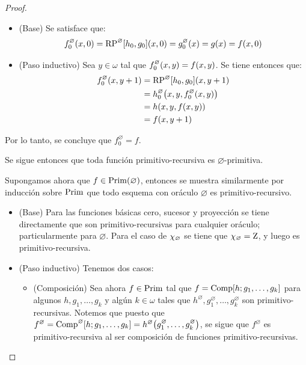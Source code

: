 \begin{proof}
\begin{enumerate}
\begin{itemize}
\begin{itemize}
				\begin{itemize}
					\item (Base) Se satisface que:
					\[
						f_{0}^{\varnothing}\pa*{x, 0} =\RECURSION^{\varnothing}\bra*{h_{0}, g_{0}}\pa*{x, 0} = g_{0}^{\varnothing}\pa*{x} = g\pa*{x} = f\pa*{x, 0}
					\]
					\item (Paso inductivo) Sea $y\in\omega$ tal que $f_{0}^{\varnothing}\pa*{x, y} = f\pa*{x, y}$. Se tiene entonces que:
					\begin{align*}
						f_{0}^{\varnothing}\pa*{x, y + 1} &=\RECURSION^{\varnothing}\bra*{h_{0}, g_{0}}\pa*{x, y + 1}\\
						&= h_{0}^{\varnothing}\pa*{x, y, f_{0}^{\varnothing}\pa*{x, y}}\\
						&= h\pa*{x, y, f\pa*{x, y}}\\
						&= f\pa*{x, y + 1}
					\end{align*}
				\end{itemize}
				Por lo tanto, se concluye que $f_{0}^{\varnothing} = f$.
			\end{itemize}
		\end{itemize}

		Se sigue entonces que toda función primitivo-recursiva es $\varnothing$-primitiva.

		Supongamos ahora que $f\in\PRIMITIVO\pa*{\varnothing}$, entonces se muestra similarmente por inducción sobre $\mathrm{Prim}$ que todo esquema con oráculo $\varnothing$ es primitivo-recursivo.

		\begin{itemize}
			\item (Base) Para las funciones básicas cero, sucesor y proyección se tiene directamente que son primitivo-recursivas para cualquier oráculo; particularmente para $\varnothing$. Para el caso de $\chi_{\varnothing}$ se tiene que $\chi_{\varnothing} =\operatorname{Z}$, y luego es primitivo-recursiva.

			\item (Paso inductivo) Tenemos dos casos:

			\begin{itemize}
				\item (Composición) Sea ahora $f\in\mathrm{Prim}$ tal que $f =\COMPOSICION\bra*{h; g_{1},\dotsc, g_{k}}$ para algunos $h, g_{1},\dotsc, g_{k}$ y algún $k\in\omega$ tales que $h^{\varnothing}, g_{1}^{\varnothing},\dotsc, g_{k}^{\varnothing}$ son primitivo-recursivas. Notemos que puesto que $f^{\varnothing} =\COMPOSICION^{\varnothing}\bra*{h; g_{1},\dotsc, g_{k}} = h^{\varnothing}\pa*{g_{1}^{\varnothing},\dotsc, g_{k}^{\varnothing}}$, se sigue que $f^{\varnothing}$ es primitivo-recursiva al ser composición de funciones primitivo-recursivas.


\end{itemize}
\end{itemize}
\end{enumerate}
\end{proof}
